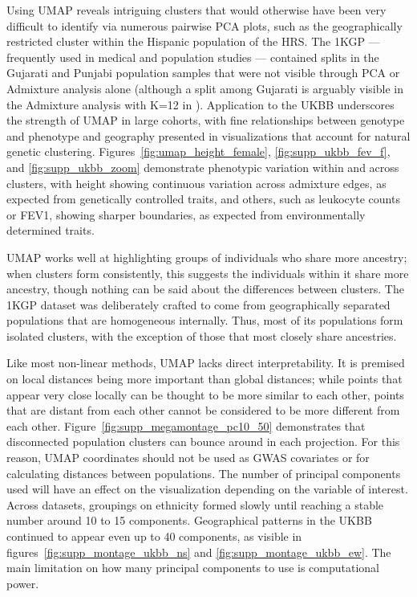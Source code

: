 \documentclass[12pt]{pnas-new}
\begin{document}
Using UMAP reveals intriguing clusters that would otherwise have been very difficult to identify via numerous pairwise PCA plots, such as the geographically restricted cluster within the Hispanic population of the HRS. The 1KGP --- frequently used in medical and population studies --- contained splits in the Gujarati and Punjabi population samples that were not visible through PCA or Admixture analysis alone (although a split among Gujarati is arguably visible in the Admixture analysis with K=12 in \cite{10002015global}). Application to the UKBB underscores the strength of UMAP in large cohorts, with fine relationships between genotype and phenotype and geography presented in visualizations that account for natural genetic clustering. Figures~\ref{fig:umap_height_female}, \ref{fig:supp_ukbb_fev_f}, and \ref{fig:supp_ukbb_zoom} demonstrate phenotypic variation within and across clusters, with height showing continuous variation across admixture edges, as expected from genetically controlled traits, and others, such as leukocyte counts or FEV1, showing sharper boundaries, as expected from environmentally determined traits.  

UMAP works well at highlighting groups of individuals who share more ancestry; when clusters form consistently, this suggests the individuals within it share more ancestry, though nothing can be said about the differences between clusters. The 1KGP dataset was deliberately crafted to come from geographically separated populations that are homogeneous internally. Thus, most of its populations form isolated clusters, with the exception of those that most closely share ancestries.

Like most non-linear methods, UMAP lacks direct interpretability. It is premised on local distances being more important than global distances; while points that appear very close locally can be thought to be more similar to each other, points that are distant from each other cannot be considered to be more different from each other. Figure~\ref{fig:supp_megamontage_pc10_50} demonstrates that disconnected population clusters can bounce around in each projection. For this reason, UMAP coordinates should not be used as GWAS covariates or for calculating distances between populations. The number of principal components used will have an effect on the visualization depending on the variable of interest. Across datasets, groupings on ethnicity formed slowly until reaching a stable number around 10 to 15 components. Geographical patterns in the UKBB continued to appear even up to 40 components, as visible in figures~\ref{fig:supp_montage_ukbb_ns} and \ref{fig:supp_montage_ukbb_ew}. The main limitation on how many principal components to use is computational power.
\end{document}
